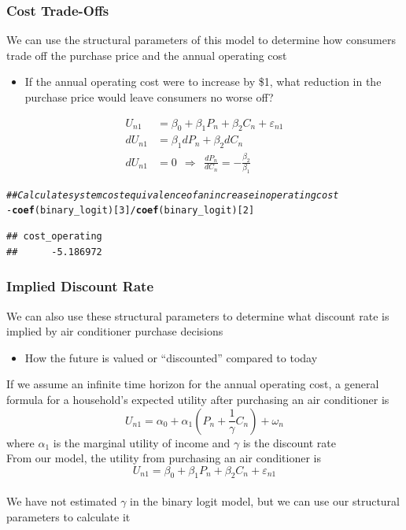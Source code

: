 \documentclass{beamer}\usepackage[]{graphicx}\usepackage[]{xcolor}
\makeatletter
\newcommand{\hlnum}[1]{\textcolor[rgb]{0.686,0.059,0.569}{#1}}%
\newcommand{\hlcom}[1]{\textcolor[rgb]{0.678,0.584,0.686}{\textit{#1}}}%
\newcommand{\hlopt}[1]{\textcolor[rgb]{0,0,0}{#1}}%
\newcommand{\hlstd}[1]{\textcolor[rgb]{0.345,0.345,0.345}{#1}}%
\newcommand{\hlkwd}[1]{\textcolor[rgb]{0.737,0.353,0.396}{\textbf{#1}}}%
\newenvironment{kframe}{%
 \def\at@end@of@kframe{}%
 \ifinner\ifhmode%
  \def\at@end@of@kframe{\end{minipage}}%
  \begin{minipage}{\columnwidth}%
 \fi\fi%
 \def\FrameCommand##1{\hskip\@totalleftmargin \hskip-\fboxsep
 \colorbox{shadecolor}{##1}\hskip-\fboxsep
     \hskip-\linewidth \hskip-\@totalleftmargin \hskip\columnwidth}%
 \MakeFramed {\advance\hsize-\width
   \@totalleftmargin\z@ \linewidth\hsize
   \@setminipage}}%
 {\par\unskip\endMakeFramed%
 \at@end@of@kframe}
\newenvironment{knitrout}{}{} %
\makeatother
\begin{document}
\begin{frame}[fragile]\frametitle{Cost Trade-Offs}
    We can use the structural parameters of this model to determine how consumers trade off the purchase price and the annual operating cost
    \begin{itemize}
        \item If the annual operating cost were to increase by \$1, what reduction in the purchase price would leave consumers no worse off?
    \end{itemize}
    \begin{align*}
        U_{n1} & = \beta_0 + \beta_1 P_n + \beta_2 C_n + \varepsilon_{n1} \\
        dU_{n1} & = \beta_1 dP_n + \beta_2 dC_n \\
        dU_{n1} & = 0 ~~ \Rightarrow ~~ \frac{dP_n}{dC_n}  = -\frac{\beta_2}{\beta_1}
    \end{align*}
\begin{knitrout}\footnotesize
{}\color{fgcolor}\begin{kframe}
\begin{alltt}
\hlcom{## Calculate system cost equivalence of an increase in operating cost}
\hlopt{-}\hlkwd{coef}\hlstd{(binary_logit)[}\hlnum{3}\hlstd{]} \hlopt{/} \hlkwd{coef}\hlstd{(binary_logit)[}\hlnum{2}\hlstd{]}
\end{alltt}
\begin{verbatim}
## cost_operating 
##      -5.186972
\end{verbatim}
\end{kframe}
\end{knitrout}
\end{frame}

\begin{frame}\frametitle{Implied Discount Rate}
    We can also use these structural parameters to determine what discount rate is implied by air conditioner purchase decisions
    \begin{itemize}
        \item How the future is valued or ``discounted'' compared to today
    \end{itemize}
    \vspace{2ex}
    If we assume an infinite time horizon for the annual operating cost, a general formula for a household's expected utility after purchasing an air conditioner is
    $$U_{n1} = \alpha_0 + \alpha_1 \left( P_n + \frac{1}{\gamma} C_n \right) + \omega_n$$
    where $\alpha_1$ is the marginal utility of income and $\gamma$ is the discount rate \\
    \vspace{2ex}
    From our model, the utility from purchasing an air conditioner is
    $$U_{n1} = \beta_0 + \beta_1 P_n + \beta_2 C_n + \varepsilon_{n1}$$ \\
    \vspace{1ex}
    We have not estimated $\gamma$ in the binary logit model, but we can use our structural parameters to calculate it
\end{frame}
\end{document}
